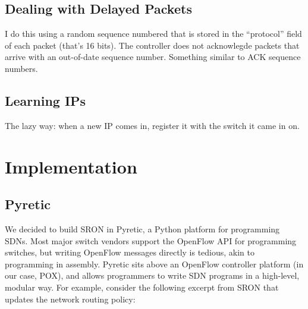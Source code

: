 \documentclass[pageno]{jpaper}
\begin{document}
\subsection{Dealing with Delayed Packets}
I do this using a random sequence numbered that is stored in the ``protocol'' field of each packet 
(that's 16 bits). The controller does not acknowlegde packets that arrive with an out-of-date sequence
number. Something similar to ACK sequence numbers.



\subsection{Learning IPs}
The lazy way: when a new IP comes in, register it with the switch it came in on.


\section{Implementation}
\subsection{Pyretic}
	We decided to build SRON in Pyretic\cite{pyretic}, a Python platform for programming SDNs.  Most major switch vendors support the OpenFlow API for programming switches, but writing OpenFlow messages directly is tedious, akin to programming in assembly. Pyretic sits above an OpenFlow controller platform (in our case, POX\cite{pox}), and allows programmers to write SDN programs in a high-level, modular way.  For example, consider the following excerpt from SRON that updates the network routing policy:\bigskip



\end{document}
